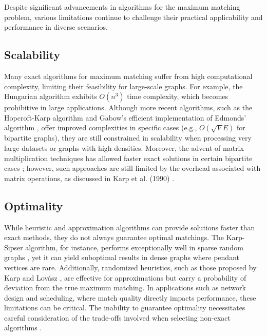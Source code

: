 Despite significant advancements in algorithms for the maximum matching problem, various limitations continue to challenge their practical applicability and performance in diverse scenarios.

\subsection{Scalability}
Many exact algorithms for maximum matching suffer from high computational complexity, limiting their feasibility for large-scale graphs. For example, the Hungarian algorithm \cite{kuhn1955hungarian} exhibits \(O(n^3)\) time complexity, which becomes prohibitive in large applications. Although more recent algorithms, such as the Hopcroft-Karp algorithm \cite{hopcroft1973n} and Gabow's efficient implementation of Edmonds' algorithm \cite{gabow1976efficient}, offer improved complexities in specific cases (e.g., \(O(\sqrt{V}E)\) for bipartite graphs), they are still constrained in scalability when processing very large datasets or graphs with high densities. Moreover, the advent of matrix multiplication techniques has allowed faster exact solutions in certain bipartite cases \cite{karp1990deterministic}; however, such approaches are still limited by the overhead associated with matrix operations, as discussed in Karp et al. (1990) \cite{karp1990deterministic}.

\subsection{Optimality}
While heuristic and approximation algorithms can provide solutions faster than exact methods, they do not always guarantee optimal matchings. The Karp-Sipser algorithm, for instance, performs exceptionally well in sparse random graphs \cite{aronson1997maximum}, yet it can yield suboptimal results in dense graphs where pendant vertices are rare. Additionally, randomized heuristics, such as those proposed by Karp and Lovász \cite{karp2011maximum}, are effective for approximations but carry a probability of deviation from the true maximum matching. In applications such as network design and scheduling, where match quality directly impacts performance, these limitations can be critical. The inability to guarantee optimality necessitates careful consideration of the trade-offs involved when selecting non-exact algorithms \cite{lovasz2013randomized}.

